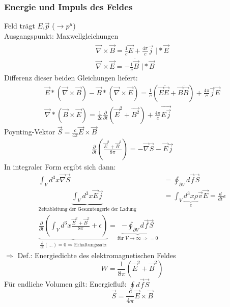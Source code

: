 \documentclass[a4paper]{article}
\begin{document}
\subsubsection{Energie und Impuls des Feldes}
Feld trägt $E$,$\vec{p}$ ($\rightarrow p^\mu$)\\
Ausgangspunkt: Maxwellgleichungen
\begin{align}
\vec{\nabla}\times\vec{B}=\frac{1}{c}\ddot{\vec{E}}+\frac{4\pi}{c}\vec{j}
\text{    |}*\vec{E}\\
\vec{\nabla}\times\vec{E}=-\frac{1}{c}\ddot{\vec{B}} \text{    |}*\vec{B}
\end{align}
Differenz dieser beiden Gleichungen liefert:
\begin{align}
\vec{E}*\left(\vec{\nabla}\times\vec{B}\right)-\vec{B}*\left(\vec{\nabla}
\times\vec{E}\right)=\frac{1}{c}(\vec{E}\ddot{\vec{E}}+\vec{B}\ddot{\vec{B}})
+\frac{4\pi}{c}\vec{j}\vec{E}\\
\vec{\nabla}*\left( \vec{B}\times\vec{E}\right)=\frac{1}{2c}
\frac{\partial}{\partial t}(\vec{E}^2+\vec{B^2})+\frac{4\pi}{c}\vec{E\vec{j}}
\end{align} 
Poynting-Vektor $\vec{S}=\frac{c}{4\pi}\vec{E}\times\vec{B}$
\begin{align}
\frac{\partial}{\partial t}\left( \frac{\vec{E}^2+\vec{B}^2}{8\pi} \right)
=-\vec{\nabla}\vec{S}-\vec{E}\vec{j}
\end{align}
In integraler Form ergibt sich dann:
\begin{align}
\int_V d^3x \vec{\nabla}\vec{S}&=\oint_{\partial V}d\!\vec{f}\vec{S}\\
\underbrace{\int_V d^3x \vec{E}\vec{j}}_{\text{Zeitableitung der Gesamtengerie
der Ladung}}&=\int_V
\underbrace{d^3x\rho}_{e}\vec{v}\vec{E}=\frac{d}{dt}\epsilon\\
\underbrace{\frac{\partial}{\partial t}\left(\int_V d^3x
\frac{\vec{E}^2+\vec{B}^2}{8\pi} +\epsilon
\right)}_{\frac{\partial}{\partial t}\left( \ldots \right)=0 \Rightarrow
\text{Erhaltungssatz}} =\underbrace{-\oint_{\partial
V}d\vec{f}\vec{S}}_{\text{für } V\rightarrow\infty \Rightarrow =0}
\end{align}
$\Rightarrow$ Def.: Energiedichte des elektromagnetischen Feldes
\begin{equation}
W=\frac{1}{8\pi}(\vec{E}^2+\vec{B}^2)
\end{equation}
Für endliche Volumen gilt: Energiefluß: $\oint d\vec{f}\vec{S}$
\begin{equation}
\vec{S}=\frac{c}{4\pi}\vec{E}\times\vec{B}
\end{equation}
\end{document}
